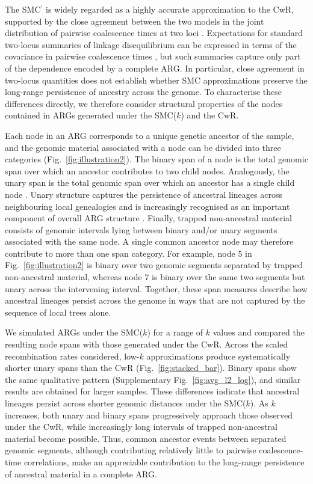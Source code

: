 \documentclass[9pt,twocolumn,twoside,lineno]{gsajnl}
\begin{document}
The SMC$^\prime$ is widely regarded as a highly accurate approximation to the CwR, supported by the close agreement between the two models in the joint distribution of pairwise coalescence times at two loci \citep{wilton_smc_2015, marjoram_fast_2006}. Expectations for standard two-locus summaries of linkage disequilibrium can be expressed in terms of the covariance in pairwise coalescence times \citep{mcVean2002genealogical, lohse2011general}, but such summaries capture only part of the dependence encoded by a complete ARG. In particular, close agreement in two-locus quantities does not establish whether SMC approximations preserve the long-range persistence of ancestry across the genome. To characterise these differences directly, we therefore consider structural properties of the nodes contained in ARGs generated under the SMC($k$) and the CwR.

Each node in an ARG corresponds to a unique genetic ancestor of the sample, and
the genomic material associated with a node can be divided into three
categories (Fig.~\ref{fig:illustration2}). The binary span of a node is the
total genomic span over which an ancestor contributes to two child nodes.
Analogously, the unary span is the total genomic span over which an ancestor has a single child node \citep{wong_general_2024}. Unary structure captures the persistence of ancestral lineages across neighbouring local genealogies and is increasingly recognised as an important component of overall ARG structure \citep{bisschop_likelihoods_2025,fritze2026forest}. Finally, trapped non-ancestral material consists of genomic intervals lying between binary and/or unary segments associated with the same node. A single common ancestor node may therefore contribute to more than one span category. For example, node 5 in Fig.~\ref{fig:illustration2} is binary over two genomic segments separated by trapped non-ancestral material, whereas node 7 is binary over the same two segments but unary across the intervening interval. Together, these span measures describe how ancestral lineages persist across the genome in ways that are not captured by the sequence of local trees alone.

We simulated ARGs under the SMC($k$) for a range of $k$ values and compared the resulting node spans with those generated under the CwR. Across the scaled recombination rates considered, low-$k$ approximations produce systematically shorter unary spans than the CwR (Fig.~\ref{fig:stacked_bar}). Binary spans show the same qualitative pattern (Supplementary Fig.~\ref{fig:avg_l2_log}), and similar results are obtained for larger samples. These differences indicate that ancestral lineages persist across shorter genomic distances under the SMC($k$). As $k$ increases, both unary and binary spans progressively approach those observed under the CwR, while increasingly long intervals of trapped non-ancestral material become possible. Thus, common ancestor events between separated genomic segments, although contributing relatively little to pairwise coalescence-time correlations, make an appreciable contribution to the long-range persistence of ancestral material in a complete ARG.
\end{document}
